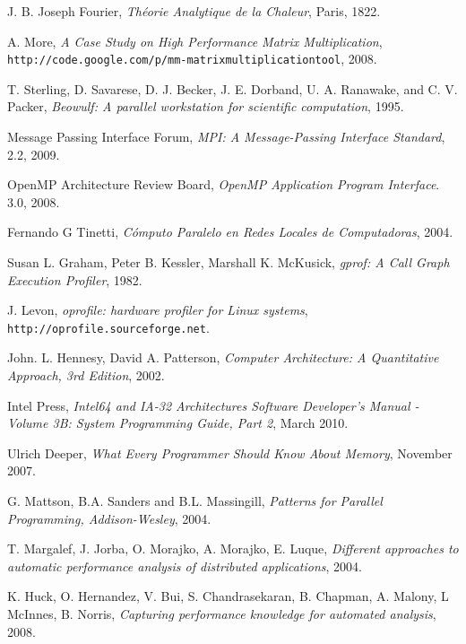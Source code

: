 \documentclass[a4paper]{report}
\begin{document}
\begin{thebibliography}{9}

  J. B. Joseph Fourier, \emph{Th\'eorie Analytique de la Chaleur}, Paris, 1822.

  A. More,
  \emph{A Case Study on High Performance Matrix Multiplication},
  {\tt http://code.google.com/p/mm-matrixmultiplicationtool},
  2008.

  T. Sterling, D. Savarese, D. J. Becker, J. E. Dorband, U. A. Ranawake,
  and C. V. Packer,
  \emph{Beowulf: A parallel workstation for scientific computation},
  1995.

  Message Passing Interface Forum,
  \emph{MPI: A Message-Passing Interface Standard},
  2.2,
  2009.

  OpenMP Architecture Review Board,
  \emph{OpenMP Application Program Interface}.
  3.0,
  2008.

  Fernando G Tinetti,
  \emph{C\'omputo Paralelo en Redes Locales de Computadoras},
  2004.

  Susan L. Graham,  Peter B. Kessler,  Marshall K. McKusick,
  \emph{gprof: A Call Graph Execution Profiler},
  1982.
  
  J. Levon,
  \emph{oprofile: hardware profiler for Linux systems},
       {\tt http://oprofile.sourceforge.net}.
  
  John. L. Hennesy, David A. Patterson,
  \emph{Computer Architecture: A Quantitative Approach, 3rd Edition},
  2002.

  Intel Press,
  \emph{Intel64 and IA-32 Architectures Software Developer's Manual - Volume
    3B: System Programming Guide, Part 2},
  March 2010.

  Ulrich Deeper,
  \emph{What Every Programmer Should Know About Memory},
  November 2007.

  G. Mattson, B.A. Sanders and B.L. Massingill, 
  \emph{Patterns for Parallel Programming, Addison-Wesley},
  2004.
  
  T. Margalef, J. Jorba, O. Morajko, A. Morajko, E. Luque,
  \emph{Different approaches to automatic performance analysis of distributed
    applications},
  2004.
  
  K. Huck, O. Hernandez, V. Bui, S. Chandrasekaran, B. Chapman, A. Malony,
  L McInnes, B. Norris,
  \emph{Capturing performance knowledge for automated analysis},
  2008.
  

\end{thebibliography}
\end{document}

